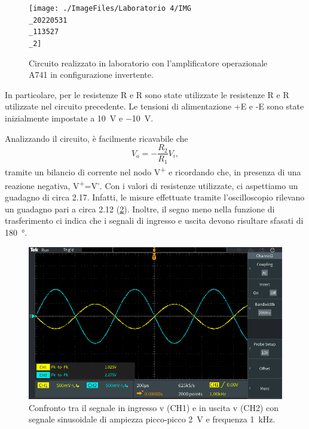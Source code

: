\begin{figure}[h!]
	\centering
	\texttt{[image: ./ImageFiles/Laboratorio 4/IMG\\\_20220531\\\_113527\\\_2]}
	\caption{Circuito realizzato in laboratorio con l'amplificatore operazionale \textmu A741 in configurazione invertente.}
	\label{fig:opamp_inv_circuito}
\end{figure}

\noindent
In particolare, per le resistenze R e R sono state utilizzate le resistenze R e R utilizzate nel circuito precedente. Le tensioni di alimentazione +E e -E sono state inizialmente impostate a \SI{+10}{\volt} e \SI{-10}{\volt}.

\noindent
Analizzando il circuito, è facilmente ricavabile che 
\begin{equation}
	V_o=-\frac{R_2}{R_1}V_i,
\end{equation}
tramite un bilancio di corrente nel nodo V\textsuperscript{+} e ricordando che, in presenza di una reazione negativa, V\textsuperscript{+}=V\textsuperscript{-}. Con i valori di resistenze utilizzate, ci aspettiamo un guadagno di circa 2.17. Infatti, le misure effettuate tramite l'oscilloscopio rilevano un guadagno pari a circa 2.12 (\Fig\ref{fig:opamp_inv_amp}). Inoltre, il segno meno nella funzione di trasferimento ci indica che i segnali di ingresso e uscita devono risultare sfasati di \SI{180}{\degree}.
\begin{figure}[h!]
	\centering
	\includegraphics[width=0.7\linewidth]{./ImageFiles/Laboratorio 4/TEK00005}
	\caption{Confronto tra il segnale in ingresso v (CH1)  e in uscita v (CH2) con segnale sinusoidale di ampiezza picco-picco \SI{2}{\volt} e frequenza \SI{1}{\kilo\hertz}.}
	\label{fig:opamp_inv_amp}
\end{figure}

